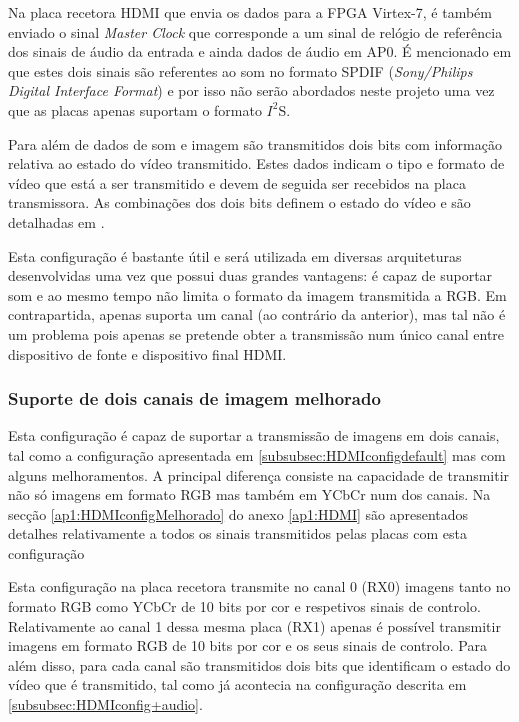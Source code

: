 Na placa recetora HDMI que envia os dados para a FPGA Virtex-7, é também enviado o sinal \textit{Master Clock} que corresponde a um sinal de relógio de referência dos sinais de áudio da entrada e ainda dados de áudio em AP0. É mencionado em \cite{R016} que estes dois sinais são referentes ao som no formato SPDIF (\textit{Sony/Philips Digital Interface Format}) e por isso não serão abordados neste projeto uma vez que as placas apenas suportam o formato $I^{2}$S.

Para além de dados de som e imagem são transmitidos dois bits com informação relativa ao estado do vídeo transmitido. Estes dados indicam o tipo e formato de vídeo que está a ser transmitido e devem de seguida ser recebidos na placa transmissora. As combinações dos dois bits definem o estado do vídeo e são detalhadas em \cite{R014}.

Esta configuração é bastante útil e será utilizada em diversas arquiteturas desenvolvidas uma vez que possui duas grandes vantagens: é capaz de suportar som e ao mesmo tempo não limita o formato da imagem transmitida a RGB. Em contrapartida, apenas suporta um canal (ao contrário da anterior), mas tal não é um problema pois apenas se pretende obter a transmissão num único canal entre dispositivo de fonte e dispositivo final HDMI. 


\subsubsection{Suporte de dois canais de imagem melhorado} \label{subsubsec:HDMIconfigMelhorado}


Esta configuração é capaz de suportar a transmissão de imagens em dois canais, tal como a configuração apresentada em \ref{subsubsec:HDMIconfigdefault} mas com alguns melhoramentos. A principal diferença consiste na capacidade de transmitir não só imagens em formato RGB mas também em YCbCr num dos canais. Na secção \ref{ap1:HDMIconfigMelhorado} do anexo \ref{ap1:HDMI} são apresentados detalhes relativamente a todos os sinais transmitidos pelas placas com esta configuração

Esta configuração na placa recetora transmite no canal 0 (RX0) imagens tanto no formato RGB como YCbCr de 10 bits por cor e respetivos sinais de controlo. Relativamente ao canal 1 dessa mesma placa (RX1) apenas é possível transmitir imagens em formato RGB de 10 bits por cor e os seus sinais de controlo. Para além disso, para cada canal são transmitidos dois bits que identificam o estado do vídeo que é transmitido, tal como já acontecia na configuração descrita em \ref{subsubsec:HDMIconfig+audio}.

